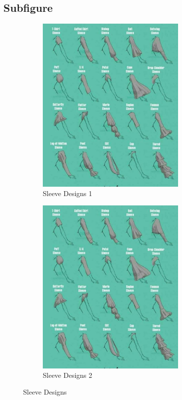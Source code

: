 \documentclass[letter, 12pt]{article}
\begin{document}
\subsection{Subfigure}
\begin{figure}[h]
	\centering
	\begin{subfigure}{.4\textwidth}
		\includegraphics[width=0.8\textwidth]{star.jpg}
		\caption{Sleeve Designs 1}
	\end{subfigure}
	\qquad %
	\begin{subfigure}{.4\textwidth}
		\includegraphics[width=0.8\textwidth]{star.jpg}
		\caption{Sleeve Designs 2}
	\end{subfigure}
	\caption{Sleeve Designs}
\end{figure}
\pagebreak
\end{document}
